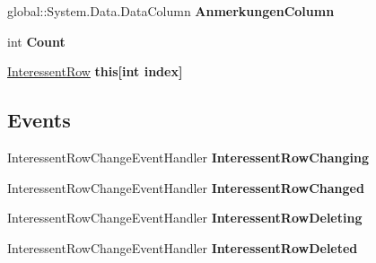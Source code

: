 \begin{DoxyCompactItemize}
\item 
global\+::\+System.\+Data.\+Data\+Column {\bfseries Anmerkungen\+Column}\hypertarget{class_products_1_1_data_1_1ds_sage_1_1_interessent_data_table_a90aced4f9d78f7a91fe086428f74bd25}{}\label{class_products_1_1_data_1_1ds_sage_1_1_interessent_data_table_a90aced4f9d78f7a91fe086428f74bd25}

\item 
int {\bfseries Count}\hypertarget{class_products_1_1_data_1_1ds_sage_1_1_interessent_data_table_ad4a14683d5e0252932f7468862ba5f34}{}\label{class_products_1_1_data_1_1ds_sage_1_1_interessent_data_table_ad4a14683d5e0252932f7468862ba5f34}

\item 
\hyperlink{class_products_1_1_data_1_1ds_sage_1_1_interessent_row}{Interessent\+Row} {\bfseries this\mbox{[}int index\mbox{]}}\hypertarget{class_products_1_1_data_1_1ds_sage_1_1_interessent_data_table_ac5e668f5307ec1f39269057d87482459}{}\label{class_products_1_1_data_1_1ds_sage_1_1_interessent_data_table_ac5e668f5307ec1f39269057d87482459}

\end{DoxyCompactItemize}
\subsection*{Events}
\begin{DoxyCompactItemize}
\item 
Interessent\+Row\+Change\+Event\+Handler {\bfseries Interessent\+Row\+Changing}\hypertarget{class_products_1_1_data_1_1ds_sage_1_1_interessent_data_table_a8fcf1019975ec531e7c4a2652cb5da47}{}\label{class_products_1_1_data_1_1ds_sage_1_1_interessent_data_table_a8fcf1019975ec531e7c4a2652cb5da47}

\item 
Interessent\+Row\+Change\+Event\+Handler {\bfseries Interessent\+Row\+Changed}\hypertarget{class_products_1_1_data_1_1ds_sage_1_1_interessent_data_table_a5c4a9d5e71b8f737e8940a87ef1f6f1f}{}\label{class_products_1_1_data_1_1ds_sage_1_1_interessent_data_table_a5c4a9d5e71b8f737e8940a87ef1f6f1f}

\item 
Interessent\+Row\+Change\+Event\+Handler {\bfseries Interessent\+Row\+Deleting}\hypertarget{class_products_1_1_data_1_1ds_sage_1_1_interessent_data_table_a70446de108483f20a890968ae39e2e38}{}\label{class_products_1_1_data_1_1ds_sage_1_1_interessent_data_table_a70446de108483f20a890968ae39e2e38}

\item 
Interessent\+Row\+Change\+Event\+Handler {\bfseries Interessent\+Row\+Deleted}\hypertarget{class_products_1_1_data_1_1ds_sage_1_1_interessent_data_table_a8d30107679dbe38b847638f29d83bdd0}{}\label{class_products_1_1_data_1_1ds_sage_1_1_interessent_data_table_a8d30107679dbe38b847638f29d83bdd0}

\end{DoxyCompactItemize}


